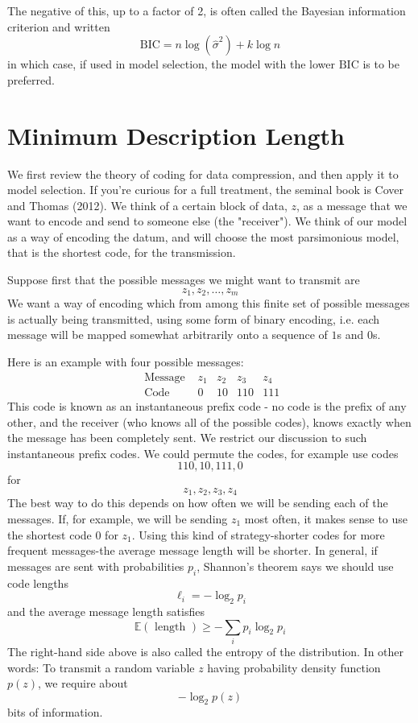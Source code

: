 \documentclass[11pt]{article}
\theoremstyle{plain} %
\theoremstyle{remark}
\begin{document}
The negative of this, up to a factor of 2, is often called the {\color{C3}Bayesian
information criterion} and written
$$
  \mathrm{BIC}=n \log \left(\hat{\sigma}^{2}\right)+k \log n
$$
in which case, if used in model selection, the model with the lower
$\mathrm{BIC}$ is to be preferred.

\section{Minimum Description Length}
We first review the theory of coding for data compression, and then
apply it to model selection. If you're curious for a full treatment, the seminal book is Cover and
Thomas (2012). We think of a certain block of data, $z$, as a message that we want to
encode and send to someone else (the "receiver"). We think of our model as a way of encoding the datum, and will choose
the most parsimonious model, that is the shortest code, for the transmission.

Suppose first that the possible messages we might want to transmit are
$$
  z_{1}, z_{2}, \ldots, z_{m}
$$
We want a way of encoding which from among this finite set of possible
messages is actually being transmitted, using some form of binary encoding,
i.e. each message will be mapped somewhat arbitrarily onto a sequence of $1$s and $0$s.

Here is an example with four possible messages:
$$
  \begin{array}{ccccc}
    \text { Message } & z_{1} & z_{2} & z_{3} & z_{4} \\
    \text { Code }    & 0     & 10    & 110   & 111
  \end{array}
$$
This code is known as an instantaneous prefix code - no code is the
prefix of any other, and the receiver (who knows all of the possible codes),
knows exactly when the message has been completely sent. We restrict our discussion to such instantaneous prefix codes. We could permute the codes, for example use codes
$$
  110,10,111,0
$$
for
$$
  z_{1}, z_{2}, z_{3}, z_{4}
$$
The best way to do this depends on how often we will be sending each of
the messages. If, for example, we will be sending $z_{1}$ most often, it makes sense
to use the shortest code 0 for $z_{1}$. Using this kind of strategy-shorter codes for more frequent messages-the
average message length will be shorter. In general, if messages are sent with probabilities $p_{i}$, Shannon's
theorem says we should use code lengths
$$
  \ell_{i}=-\log _{2} p_{i}
$$
and the average message length satisfies
$$
  \mathbb{E}(\text { length }) \geq-\sum_{i} p_{i} \log _{2} p_{i}
$$
The right-hand side above is also called the entropy of the
distribution. In other words: To transmit a random variable $z$ having probability
density function $p(z)$, we require about
$$
  -\log _{2} p(z)
$$
bits of information.
\end{document}
